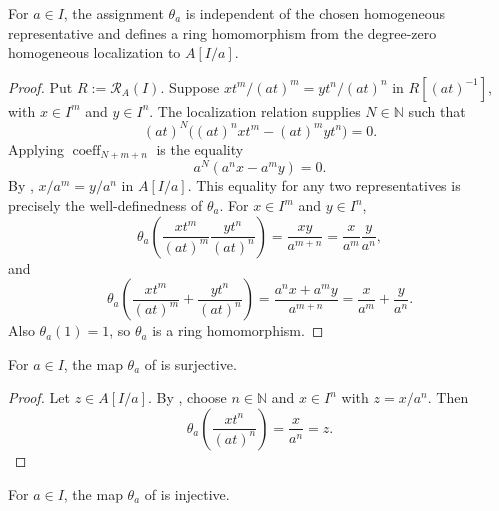 \begin{lemma}
  \label{lemma:nagata-homogeneous-away-to-chart}

  For $a\in I$, the assignment $\theta_a$ is independent of the chosen homogeneous
  representative and defines a ring homomorphism from the degree-zero
  homogeneous localization to $A[I/a]$.
\end{lemma}

\begin{proof}
  Put $R:=\mathcal R_A(I)$.  Suppose
  $xt^m/(at)^m=yt^n/(at)^n$ in $R[(at)^{-1}]$, with
  $x\in I^m$ and $y\in I^n$.  The localization relation supplies
  $N\in\mathbb N$ such that
  \[
    (at)^N\bigl((at)^nxt^m-(at)^myt^n\bigr)=0.
  \]
  Applying $\operatorname{coeff}_{N+m+n}$ is the equality
  \[
    a^N(a^nx-a^my)=0.
  \]
  By ,
  $x/a^m=y/a^n$ in $A[I/a]$.  This equality for any two representatives is
  precisely the well-definedness of $\theta_a$.  For
  $x\in I^m$ and $y\in I^n$,
  \[
    \theta_a\!\left(\frac{xt^m}{(at)^m}
      \frac{yt^n}{(at)^n}\right)
      =\frac{xy}{a^{m+n}}
      =\frac{x}{a^m}\frac{y}{a^n},
  \]
  and
  \[
    \theta_a\!\left(\frac{xt^m}{(at)^m}
      +\frac{yt^n}{(at)^n}\right)
      =\frac{a^nx+a^my}{a^{m+n}}
      =\frac{x}{a^m}+\frac{y}{a^n}.
  \]
  Also $\theta_a(1)=1$, so $\theta_a$ is a ring homomorphism.
\end{proof}

\begin{lemma}
  \label{lemma:nagata-homogeneous-away-to-chart-surjective}

  For $a\in I$, the map $\theta_a$ of
   is
  surjective.
\end{lemma}

\begin{proof}
  Let $z\in A[I/a]$.  By
  , choose $n\in\mathbb N$ and
  $x\in I^n$ with $z=x/a^n$.  Then
  \[
    \theta_a\!\left(\frac{xt^n}{(at)^n}\right)=\frac{x}{a^n}=z.
  \]
\end{proof}

\begin{lemma}
  \label{lemma:nagata-homogeneous-away-to-chart-injective}

  For $a\in I$, the map $\theta_a$ of
   is
  injective.
\end{lemma}

